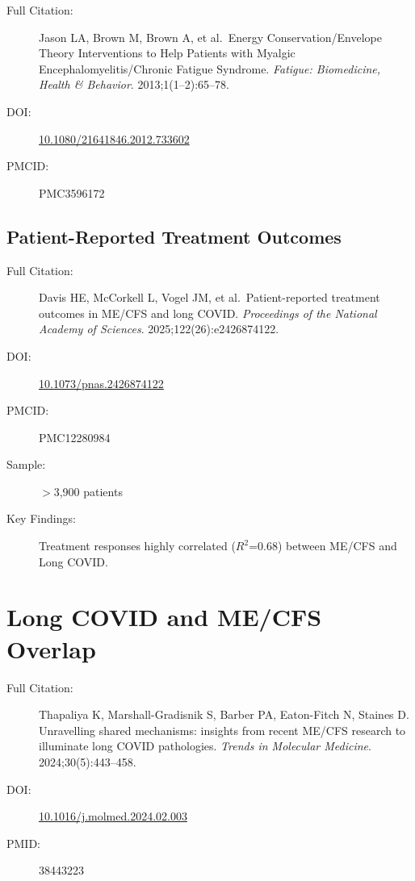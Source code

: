 \begin{description}
    \item[Full Citation:] Jason LA, Brown M, Brown A, et al.\ Energy Conservation/Envelope Theory Interventions to Help Patients with Myalgic Encephalomyelitis/Chronic Fatigue Syndrome. \textit{Fatigue: Biomedicine, Health \& Behavior}. 2013;1(1--2):65--78.
    \item[DOI:] \href{https://doi.org/10.1080/21641846.2012.733602}{10.1080/21641846.2012.733602}
    \item[PMCID:] PMC3596172
\end{description}

\subsection{Patient-Reported Treatment Outcomes}

\begin{description}
    \item[Full Citation:] Davis HE, McCorkell L, Vogel JM, et al.\ Patient-reported treatment outcomes in ME/CFS and long COVID. \textit{Proceedings of the National Academy of Sciences}. 2025;122(26):e2426874122.
    \item[DOI:] \href{https://doi.org/10.1073/pnas.2426874122}{10.1073/pnas.2426874122}
    \item[PMCID:] PMC12280984
    \item[Sample:] $>$3,900 patients
    \item[Key Findings:] Treatment responses highly correlated ($R^2$=0.68) between ME/CFS and Long COVID.
\end{description}

\section{Long COVID and ME/CFS Overlap}
\label{sec:bib-long-covid}

\begin{description}
    \item[Full Citation:] Thapaliya K, Marshall-Gradisnik S, Barber PA, Eaton-Fitch N, Staines D. Unravelling shared mechanisms: insights from recent ME/CFS research to illuminate long COVID pathologies. \textit{Trends in Molecular Medicine}. 2024;30(5):443--458.
    \item[DOI:] \href{https://doi.org/10.1016/j.molmed.2024.02.003}{10.1016/j.molmed.2024.02.003}
    \item[PMID:] 38443223
\end{description}

